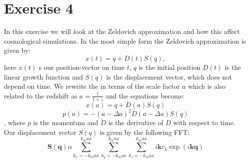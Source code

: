 \section{Exercise 4}
In this exercise we will look at the Zeldovich approximation and how this affect cosmological simulations.
In the most simple form the Zeldovich approximation is given by:
\begin{equation}
x(t)=q+D(t)S(q),
\end{equation}
here $x(t)$ s our position-vector on time $t$, $q$ is the initial position $D(t)$ is the linear growth function and $S(q)$ is the displacement vector, which does not depend on time.
We rewrite the in terms of the scale factor $a$ which is also related to the redshift as $a=\frac{1}{1+z}$ and the equations become:
\begin{equation}
x(a)=q+D(a)S(q) 
\end{equation}
\begin{equation}
p(a)=-(a-\Delta a)^2\dot{D}(a-\Delta a)S(q)
\end{equation}
, where $p$ is the momentum and $\dot{D}$ is the derivative of $D$ with respect to time. Our displacement vector $S(q)$ is given by the following FFT:
\begin{equation}
\mathbf{S(q)}\alpha\displaystyle\sum_{k_x=-k_max}^{k_max}\sum_{k_y=-k_max}^{k_max}\sum_{k_z=-k_max}^{k_max}{i\mathbf{k}c_k\exp(i\mathbf{k}\mathbf{q})}
\end{equation}

